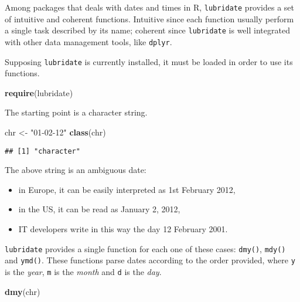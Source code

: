 \documentclass[]{book}
\newenvironment{Shaded}{\begin{snugshade}}{\end{snugshade}}
\newcommand{\KeywordTok}[1]{\textcolor[rgb]{0.13,0.29,0.53}{\textbf{{#1}}}}
\newcommand{\StringTok}[1]{\textcolor[rgb]{0.31,0.60,0.02}{{#1}}}
\newcommand{\NormalTok}[1]{{#1}}
\providecommand{\tightlist}{%
  \setlength{\itemsep}{0pt}\setlength{\parskip}{0pt}}
\def\tightlist{}
\begin{document}
Among packages that deals with dates and times in R, \texttt{lubridate}
provides a set of intuitive and coherent functions. Intuitive since each
function usually perform a single task described by its name; coherent
since \texttt{lubridate} is well integrated with other data management
tools, like \texttt{dplyr}.

Supposing \texttt{lubridate} is currently installed, it must be loaded
in order to use its functions.

\begin{Shaded}
\begin{Highlighting}[]
\KeywordTok{require}\NormalTok{(lubridate)}
\end{Highlighting}
\end{Shaded}

The starting point is a character string.

\begin{Shaded}
\begin{Highlighting}[]
\NormalTok{chr <-}\StringTok{ "01-02-12"}
\KeywordTok{class}\NormalTok{(chr)}
\end{Highlighting}
\end{Shaded}

\begin{verbatim}
## [1] "character"
\end{verbatim}

The above string is an ambiguous date:

\begin{itemize}
\tightlist
\item
  in Europe, it can be easily interpreted as 1st February 2012,
\item
  in the US, it can be read as January 2, 2012,
\item
  IT developers write in this way the day 12 February 2001.
\end{itemize}

\texttt{lubridate} provides a single function for each one of these
cases: \texttt{dmy()}, \texttt{mdy()} and \texttt{ymd()}. These
functions parse dates according to the order provided, where \texttt{y}
is the \emph{year}, \texttt{m} is the \emph{month} and \texttt{d} is the
\emph{day}.

\begin{Shaded}
\begin{Highlighting}[]
\KeywordTok{dmy}\NormalTok{(chr)}
\end{Highlighting}
\end{Shaded}
\end{document}
